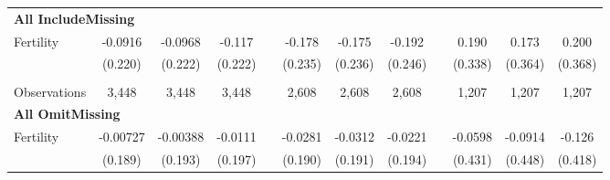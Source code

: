 \begin{landscape}
\begin{table}[htpb!]
\begin{center}
\begin{tabular}{lcccp{2mm}cccp{2mm}ccc}
\multicolumn{12}{l}{\textbf{All IncludeMissing}}\\ 
Fertility&-0.0916&-0.0968&-0.117&&-0.178&-0.175&-0.192&&0.190&0.173&0.200\\
&(0.220)&(0.222)&(0.222)&&(0.235)&(0.236)&(0.246)&&(0.338)&(0.364)&(0.368)\\
\begin{footnotesize}\end{footnotesize}&\begin{footnotesize}\end{footnotesize}&\begin{footnotesize}\end{footnotesize}&\begin{footnotesize}\end{footnotesize}&\begin{footnotesize}\end{footnotesize}&\begin{footnotesize}\end{footnotesize}&\begin{footnotesize}\end{footnotesize}&\begin{footnotesize}\end{footnotesize}&\begin{footnotesize}\end{footnotesize}&\begin{footnotesize}\end{footnotesize}&\begin{footnotesize}\end{footnotesize}&\begin{footnotesize}\end{footnotesize}\\Observations&3,448&3,448&3,448&&2,608&2,608&2,608&&1,207&1,207&1,207\\
\multicolumn{12}{l}{\textbf{All OmitMissing}}\\ 
Fertility&-0.00727&-0.00388&-0.0111&&-0.0281&-0.0312&-0.0221&&-0.0598&-0.0914&-0.126\\
&(0.189)&(0.193)&(0.197)&&(0.190)&(0.191)&(0.194)&&(0.431)&(0.448)&(0.418)\\

\end{tabular}
\end{center}
\end{table}
\end{landscape}
